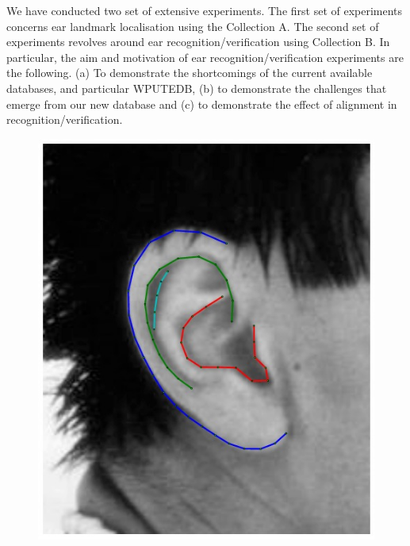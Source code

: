 We have conducted two set of extensive experiments. The first set of experiments concerns ear landmark localisation using the Collection A. The second set of experiments revolves around ear recognition/verification using Collection B. In particular, the aim and motivation of ear recognition/verification experiments are the following. (a) To demonstrate the shortcomings of the current available databases, and particular WPUTEDB, (b) to demonstrate the challenges that emerge from our new database and (c) to demonstrate the effect of alignment in recognition/verification.  



\begin{figure}[!t]
\centering
\newcommand{\flowh}{0.29\columnwidth}
    \centering
    \includegraphics[height=\flowh]{resources/Ear_Deformable_Model/ear_02}
    \hfill

\end{figure}
